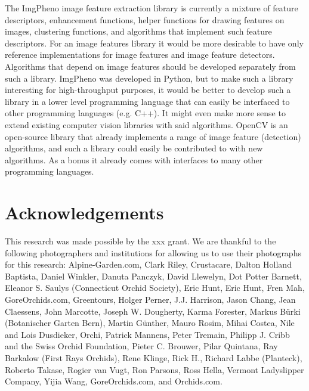 \documentclass[3p,twocolumn,10pt]{elsarticle}
\begin{document}
The ImgPheno image feature extraction library is currently a mixture of feature descriptors, enhancement functions, helper functions for drawing features on images, clustering functions, and algorithms that implement such feature descriptors. For an image features library it would be more desirable to have only reference implementations for image features and image feature detectors. Algorithms that depend on image features should be developed separately from such a library. ImgPheno was developed in Python, but to make such a library interesting for high-throughput purposes, it would be better to develop such a library in a lower level programming language that can easily be interfaced to other programming languages (e.g. C++). It might even make more sense to extend existing computer vision libraries with said algorithms. OpenCV is an open-source library that already implements a range of image feature (detection) algorithms, and such a library could easily be contributed to with new algorithms. As a bonus it already comes with interfaces to many other programming languages.


\section*{Acknowledgements}
\label{sec:acknowledgements}


This research was made possible by the xxx grant. We are thankful to the following photographers and institutions for allowing us to use their photographs for this research: Alpine-Garden.com, Clark Riley, Crustacare, Dalton Holland Baptista, Daniel Winkler, Danuta Panczyk, David Llewelyn, Dot Potter Barnett, Eleanor S. Saulys (Connecticut Orchid Society), Eric Hunt, Eric Hunt, Fren Mah, GoreOrchids.com, Greentours, Holger Perner, J.J. Harrison, Jason Chang, Jean Claessens, John Marcotte, Joseph W. Dougherty, Karma Forester, Markus Bürki (Botanischer Garten Bern), Martin Günther, Mauro Rosim, Mihai Costea, Nile and Lois Dusdieker, Orchi, Patrick Mannens, Peter Tremain, Philipp J. Cribb and the Swiss Orchid Foundation, Pieter C. Brouwer, Pilar Quintana, Ray Barkalow (First Rays Orchids), Rene Klinge, Rick H., Richard Labbe (Planteck), Roberto Takase, Rogier van Vugt, Ron Parsons, Ross Hella, Vermont Ladyslipper Company, Yijia Wang, GoreOrchids.com, and Orchids.com.
\end{document}
